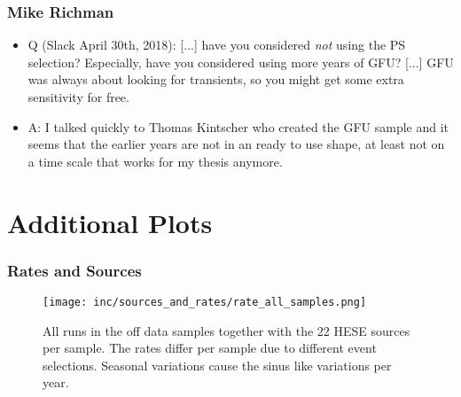 \subsubsection*{Mike Richman}
  \begin{itemize}
      \item Q (Slack April 30th, 2018):
        [...] have you considered \emph{not} using the PS selection? Especially, have you considered using more years of GFU?
        [...] GFU was always about looking for transients, so you might get some extra sensitivity for free.
      \item A:
        I talked quickly to Thomas Kintscher who created the GFU sample and it seems that the earlier years are not in an ready to use shape, at least not on a time scale that works for my thesis anymore.
  \end{itemize}



\section{Additional Plots}

\subsubsection{Rates and Sources}
\begin{figure}[htbp]
  \centering
  \texttt{[image: inc/sources\_and\_rates/rate\_all\_samples.png]}
  \caption{All runs in the off data samples together with the 22 HESE sources per sample. The rates differ per sample due to different event selections. Seasonal variations cause the sinus like variations per year.}
  \label{fig:rate_all_samples}
\end{figure}

